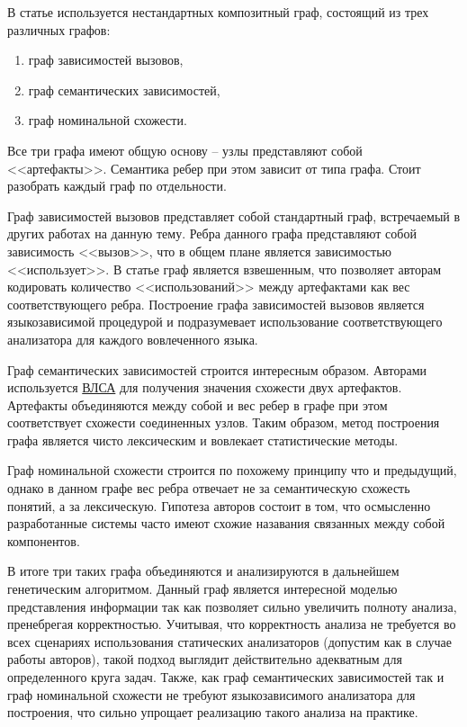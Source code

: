 В статье используется нестандартных композитный граф, состоящий из трех различных графов:
\begin{enumerate}[label=\arabic*.]
    \item граф зависимостей вызовов,
    \item граф семантических зависимостей,
    \item граф номинальной схожести.
\end{enumerate}
Все три графа имеют общую основу -- узлы представляют собой <<артефакты>>. Семантика ребер при этом зависит от типа графа.
Стоит разобрать каждый граф по отдельности.

Граф зависимостей вызовов представляет собой стандартный граф, встречаемый в других работах на данную тему. Ребра данного графа
представляют собой зависимость <<вызов>>, что в общем плане является зависимостью <<использует>>. В статье граф является взвешенным, что
позволяет авторам кодировать количество <<использований>> между артефактами как вес соответствующего ребра.
Построение графа зависимостей вызовов является языкозависимой процедурой и подразумевает использование соответствующего
анализатора для каждого вовлеченного языка.

Граф семантических зависимостей строится интересным образом. Авторами используется \hyperlink{ВЛСА}{ВЛСА} для получения
значения схожести двух артефактов. Артефакты объединяются между собой и вес ребер в графе при этом соответствует схожести соединенных
узлов. Таким образом, метод построения графа является чисто лексическим и вовлекает статистические методы.

Граф номинальной схожести строится по похожему принципу что и предыдущий, однако в данном графе вес ребра отвечает не
за семантическую схожесть понятий, а за лексическую. Гипотеза авторов состоит в том, что осмысленно разработанные
системы часто имеют схожие назавания связанных между собой компонентов.

В итоге три таких графа объединяются и анализируются в дальнейшем генетическим алгоритмом. Данный граф
является интересной моделью представления информации так как позволяет сильно увеличить полноту анализа, пренебрегая
корректностью. Учитывая, что корректность анализа не требуется во всех сценариях использования статических анализаторов
(допустим как в случае работы авторов), такой подход выглядит действительно адекватным для определенного круга задач.
Также, как граф семантических зависимостей так и граф номинальной схожести не требуют языкозависимого анализатора для построения, что
сильно упрощает реализацию такого анализа на практике.


